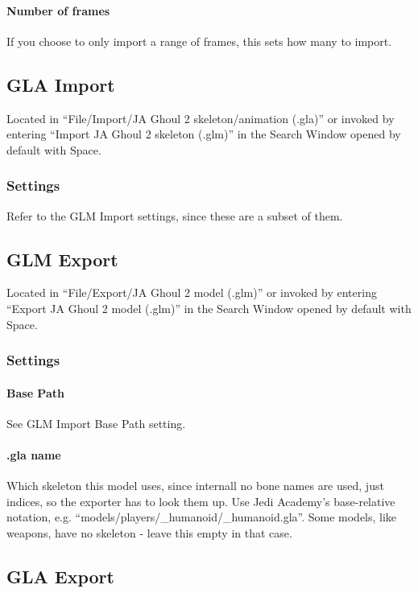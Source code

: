 \documentclass[a4paper,10pt]{article}
\begin{document}
 \paragraph*{Number of frames}
 If you choose to only import a range of frames, this sets how many to import.
 
 
 \subsection{GLA Import}
 
 Located in ``File/Import/JA Ghoul 2 skeleton/animation (.gla)'' or invoked by entering ``Import JA Ghoul 2
 skeleton (.glm)'' in the Search Window opened by default with Space.
 
 \subsubsection*{Settings}
 
 Refer to the GLM Import settings, since these are a subset of them.
 
 
 \subsection{GLM Export}
 
 Located in ``File/Export/JA Ghoul 2 model (.glm)'' or invoked by entering ``Export JA Ghoul 2 model (.glm)''
 in the Search Window opened by default with Space.
 
 \subsubsection*{Settings}
 
 \paragraph*{Base Path}
 See GLM Import Base Path setting.
 
 \paragraph*{.gla name}
 Which skeleton this model uses, since internall no bone names are used, just indices, so the exporter has
 to look them up. Use Jedi Academy's base-relative notation, e.g. ``models/players/\_humanoid/\_humanoid.gla''.
 Some models, like weapons, have no skeleton - leave this empty in that case.
 
 
 \subsection{GLA Export}
 
\end{document}
